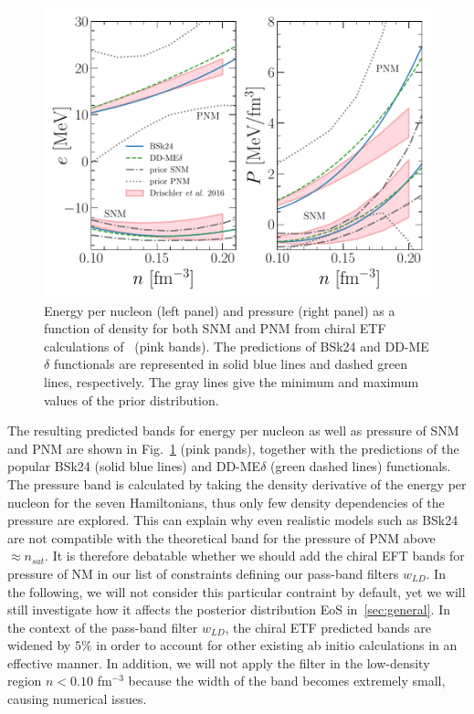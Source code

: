 \begin{figure}[!t]
\begin{center}
  \includegraphics[width=0.9\linewidth]{figures/drischler.pdf}
\end{center}
\caption[Energy per nucleon and pressure of nuclear matter versus density from 
chiral effective field theory caclulations]{Energy per nucleon 
  (left panel) and pressure (right panel) as a function of density for both SNM 
  and PNM from chiral ETF calculations of~\cite{Drischler2016} (pink
bands). The predictions of BSk24 and DD-ME$\delta$ functionals are represented 
in solid blue lines and dashed green lines, respectively. The gray lines
give the minimum and maximum values of the prior 
distribution.}\label{fig:drischler}
\end{figure}

The resulting predicted bands for energy per nucleon as well as pressure of SNM
and PNM are shown in Fig.~\ref{fig:drischler} (pink pands), together with 
the predictions of the popular BSk24 (solid blue lines) and DD-ME$\delta$ 
(green dashed lines) functionals. 
The pressure band is calculated by taking the density derivative of the energy 
per nucleon for the seven Hamiltonians, thus only few density dependencies of 
the pressure are explored. This can explain why even realistic models such as 
BSk24 are not compatible with the theoretical band for the 
pressure of PNM above $\approx n_{sat}$. It is therefore debatable whether 
we should add the chiral EFT bands for pressure of NM in our list of
constraints defining our pass-band filters $w_{LD}$. In the following, we will 
not consider this particular contraint by default, yet we will still 
investigate how it affects the posterior distribution EoS in~\ref{sec:general}.
In the context of the pass-band filter $w_{LD}$, the chiral ETF predicted 
bands are widened by $5\%$ in order to account for other existing ab initio 
calculations in an effective manner. In addition, we will not apply the filter
in the low-density region $n < 0.10$ fm$^{-3}$ because the width of the band 
becomes extremely small, causing numerical issues.


